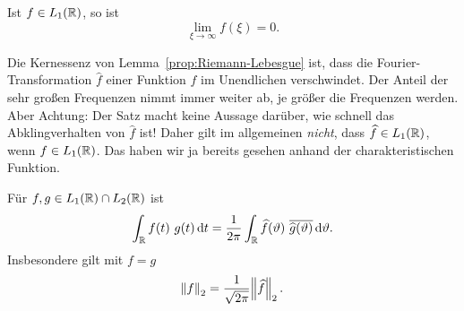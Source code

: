 \begin{proposition}\label{prop:Riemann-Lebesgue}
Ist $ f \in L_{1}(\mathbb{R}) $, so ist
\[
  \lim\limits_{\xi \to \infty} f(\xi) = 0.
\]
\end{proposition}

\begin{remark}
Die Kernessenz von Lemma~\ref{prop:Riemann-Lebesgue} ist, dass die Fourier-Transformation 
$ \widehat{f} $ einer Funktion $ f $ im Unendlichen verschwindet. Der Anteil der sehr großen
Frequenzen nimmt immer weiter ab, je größer die Frequenzen werden. Aber Achtung: Der Satz macht
keine Aussage darüber, wie schnell das Abklingverhalten von $ \widehat{f} $ ist! Daher gilt im
allgemeinen \emph{nicht}, dass $ \widehat{f} \in L_{1}(\mathbb{R}) $, wenn $ f \in L_{1}(\mathbb{R}) $. Das haben
wir ja bereits gesehen anhand der charakteristischen Funktion.
\end{remark}

\begin{proposition}
Für $ f, g \in L_{1}(\mathbb{R}) \cap L_{2}(\mathbb{R}) $ ist
\[
    \int_{\R} f(t) \ g(t) \dif t 
  = \frac{1}{2\pi} \int_{\R} \widehat{f}(\vartheta) \ \overline{\widehat{g}(\vartheta)}
      \dif \vartheta.
\]
Insbesondere gilt mit $ f = g $
\[
  \norm{f}_{2} = \frac{1}{\sqrt{2\pi}} \norm{\widehat{f}}_{2}.
\]
\end{proposition}

